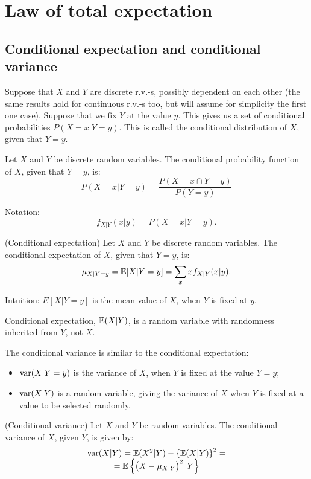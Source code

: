 \section{Law of total expectation}
\subsection*{Conditional expectation and conditional variance}
\par
Suppose that $X$ and $Y$ are discrete r.v.-s, possibly dependent on each other (the same results hold for continuous r.v.-s too, but will assume for simplicity the first one case). Suppose that we fix $Y$ at the value $y$. This gives us a set of conditional probabilities $P(X = x| Y = y)$. This is called the conditional distribution of $X$, given that $Y = y$.

\begin{definition}{}{}
    Let $X$ and $Y$ be discrete random variables. The conditional probability function of $X$, given that $Y = y$, is:
    \[
        P(X = x| Y = y) = \dfrac{P(X = x \cap Y=y)}{P(Y=y)}  
    \]
\end{definition}

\begin{note}{}{}
    Notation:
    \useshortskip
    \[
        f_{X|Y}(x|y) = P(X = x| Y=y).    
    \]
\end{note}
\begin{definition}{(Conditional expectation)}{}
    Let $X$ and $Y$ be discrete random variables. The conditional expectation of $X$, given that $Y = y$, is:
    \[
        \mu_{X|Y=y}  = \mathbb{E} [X | Y = y] = \sum\limits_{x} xf_{X|Y}(x|y).
    \] 
\end{definition}
\begin{note}{}{}
    Intuition: $E[X | Y = y]$ is the mean value of $X$, when $Y$ is fixed at $y$.
\end{note}

\begin{note}{}{}
    Conditional expectation, $\mathbb{E} (X|Y)$, is a random variable with randomness inherited from $Y$, not $X$.
\end{note}
The conditional variance is similar to the conditional expectation:
\begin{itemize}
    \item $\operatorname{var} (X| Y = y)$ is the variance of $X$, when $Y$ is fixed at the value $Y = y$;
    \item $\operatorname{var} (X|Y)$ is a random variable, giving the variance of $X$ when $Y$ is fixed at a value to be selected randomly.
\end{itemize}
\begin{definition}{(Conditional variance)}{}
    Let $X$ and $Y$ be random variables. The conditional variance of $X$, given $Y$, is given by:
    \[
        \begin{array}{c}
            \operatorname{var} (X|Y) = \mathbb{E} (X^2 | Y) - \left\{\mathbb{E} (X|Y)\right\}^2 = \\ = \mathbb{E} \left\{\left(X - \mu_{X|Y}\right)^2 | Y\right\}              
        \end{array}
    \]
\end{definition}

